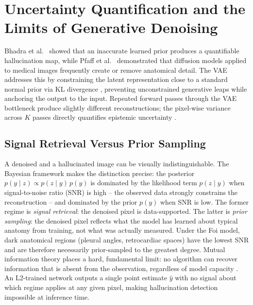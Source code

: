 \documentclass[12pt, a4paper, twoside, openright]{book}
\begin{document}
\section{Uncertainty Quantification and the Limits of Generative Denoising}
\label{sec:lit:uncertainty}

Bhadra et al.\ \cite{bhadra_hallucinations_2021} showed that an inaccurate learned prior produces a quantifiable hallucination map, while Pfaff et al.\ \cite{pfaff_no-new-denoiser_2024} demonstrated that diffusion models applied to medical images frequently create or remove anatomical detail. The VAE addresses this by constraining the latent representation close to a standard normal prior via KL divergence \cite{kingma_auto-encoding_2014}, preventing unconstrained generative leaps while anchoring the output to the input. Repeated forward passes through the VAE bottleneck produce slightly different reconstructions; the pixel-wise variance across $K$ passes directly quantifies epistemic uncertainty \cite{kendall_what_2017}.

\subsection{Signal Retrieval Versus Prior Sampling}
\label{sec:lit:uncertainty:retrieval}

A denoised and a hallucinated image can be visually indistinguishable. The Bayesian framework makes the distinction precise: the posterior $p(y \mid z) \propto p(z \mid y)\,p(y)$ is dominated by the likelihood term $p(z \mid y)$ when signal-to-noise ratio (SNR) is high -- the observed data strongly constrains the reconstruction -- and dominated by the prior $p(y)$ when SNR is low. The former regime is \emph{signal retrieval}: the denoised pixel is data-supported. The latter is \emph{prior sampling}: the denoised pixel reflects what the model has learned about typical anatomy from training, not what was actually measured. Under the Foi model, dark anatomical regions (pleural angles, retrocardiac spaces) have the lowest SNR and are therefore necessarily prior-sampled to the greatest degree. Mutual information theory places a hard, fundamental limit: no algorithm can recover information that is absent from the observation, regardless of model capacity \cite{lucas_dont_2019}. An L2-trained network outputs a single point estimate $\hat{y}$ with no signal about which regime applies at any given pixel, making hallucination detection impossible at inference time.
\end{document}
